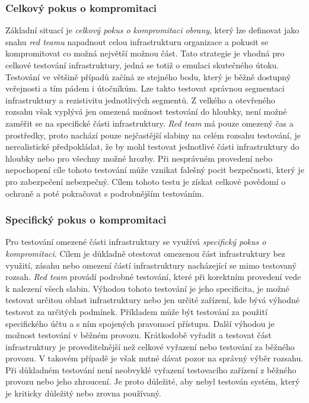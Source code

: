 \subsubsection{Celkový pokus o kompromitaci}
Základní situací je \textit{celkový pokus o kompromitaci obrany}, který lze definovat jako snahu \textit{red teamu} napadnout celou infrastrukturu organizace a pokusit se kompromitovat co možná největší možnou část.
Tato strategie je vhodná pro celkové testování infrastruktury, jedná se totiž o emulaci skutečného útoku.
Testování ve většině případů začíná ze stejného bodu, který je běžně dostupný veřejnosti a tím pádem i útočníkům.
Lze takto testovat správnou segmentaci infrastruktury a rezistivitu jednotlivých segmentů.
Z velkého a otevřeného rozsahu však vyplývá jen omezená možnost testování do hloubky, není možné zaměřit se na specifické části infrastruktury.
\textit{Red team} má pouze omezený čas a prostředky, proto nachází pouze nejčastější slabiny na celém rozsahu testování, je nerealistické předpokládat, že by mohl testovat jednotlivé části infrastruktury do hloubky nebo pro všechny možné hrozby.
Při nesprávném provedení nebo nepochopení cíle tohoto testování může vznikat falešný pocit bezpečnosti, který je pro zabezpečení nebezpečný.
Cílem tohoto testu je získat celkové povědomí o ochraně a poté pokračovat s podrobnějším testováním.

\subsubsection{Specifický pokus o kompromitaci}
Pro testování omezené části infrastruktury se využívá \textit{specifický pokus o kompromitaci}.
Cílem je důkladně otestovat omezenou část infrastruktury bez využití, zásahu nebo omezení částí infrastruktury nacházející se mimo testovaný rozsah.
\textit{Red team} provádí podrobné testování, které při korektním provedení vede k nalezení všech slabin.
Výhodou tohoto testování je jeho specificita, je možné testovat určitou oblast infrastruktury nebo jen určité zařízení, kde bývá výhodné testovat za určitých podmínek.
Příkladem může být testování za použití specifického účtu a s ním spojených pravomocí přístupu.
Další výhodou je možnost testování v běžném provozu.
Krátkodobě vyřadit a testovat část infrastruktury je proveditelnější než celkové vyřazení nebo testování za běžného provozu.
V takovém případě je však nutné dávat pozor na správný výběr rozsahu.
Při důkladném testování není neobvyklé vyřazení testovacího zařízení z běžného provozu nebo jeho zhroucení.
Je proto důležité, aby nebyl testován systém, který je kriticky důležitý nebo zrovna používaný.

